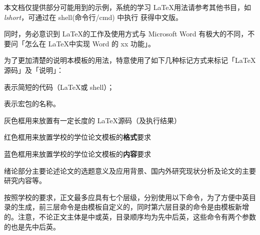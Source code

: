 


本文档仅提供部分可能用到的示例，系统的学习 \LaTeX 用法请参考其他书目，如 \emph{lshort}，可通过在 shell(命令行/cmd) 中执行  获得中文版。

同时，务必意识到 \LaTeX 的工作及使用方式与 Microsoft Word 有极大的不同，不要问「怎么在 \LaTeX 中实现 Word 的 xx 功能」。


为了更加清楚的说明本模板的用法，特意使用了如下几种标记方式来标记「\LaTeX 源码」及「说明」：

表示简短的代码（\LaTeX 或 shell）；

表示宏包的名称。

\begin{tcolorbox}
  灰色框用来放置有一定长度的 \LaTeX 源码（及执行结果）
\end{tcolorbox}

\begin{tcolorbox}[colback=red!5!white,colframe=red!75!black]
  红色框用来放置学校的学位论文模板的\textbf{格式}要求
\end{tcolorbox}

\begin{tcolorbox}[colback=blue!5!white,colframe=blue!75!black]
  蓝色框用来放置学校的学位论文模板的\textbf{内容}要求
\end{tcolorbox}

\begin{tcolorbox}[colback=blue!5!white,colframe=blue!75!black,title=绪论部分的要求]
  绪论部分主要论述论文的选题意义及应用背景、国内外研究现状分析及论文的主要研究内容等。
\end{tcolorbox}

\clearpage



按照学校的要求，正文最多应具有七个层级，分别使用以下命令，为了方便中英目录的生成，前三层命令是由模板自定义的，同时第六层目录的命令是由模板新增的。注意，不论正文主体是中或英，目录顺序均为先中后英，这些命令有两个参数的也是先中后英。

